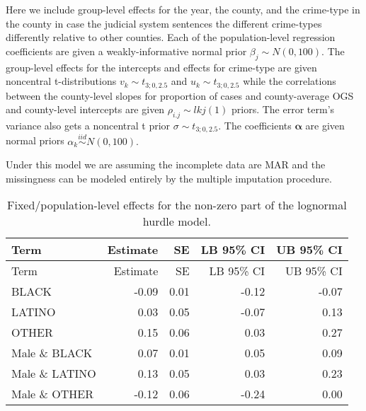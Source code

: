 \documentclass[
  letterpaper,
  DIV=11,
  numbers=noendperiod]{scrartcl}
\begin{document}
Here we include group-level effects for the year, the county, and the
crime-type in the county in case the judicial system sentences the
different crime-types differently relative to other counties. Each of
the population-level regression coefficients are given a
weakly-informative normal prior \(\beta_j \sim N(0, 100).\) The
group-level effects for the intercepts and effects for crime-type are
given noncentral t-distributions \(v_k \sim t_{3; 0, 2.5}\) and
\(u_k \sim t_{3; 0, 2.5}\) while the correlations between the
county-level slopes for proportion of cases and county-average OGS and
county-level intercepts are given \(\rho_{i.j} \sim lkj(1)\) priors. The
error term's variance also gets a noncentral t prior
\(\sigma \sim t_{3; 0, 2.5}.\) The coefficients \(\boldsymbol{\alpha}\)
are given normal priors \(\alpha_k \overset{iid}{\sim} N(0, 100).\)

Under this model we are assuming the incomplete data are MAR and the
missingness can be modeled entirely by the multiple imputation
procedure.

\hypertarget{tbl-brms-hurdle-model-summary-2-racesex}{}
\begin{longtable}[]{@{}lrrrr@{}}
\caption{\label{tbl-brms-hurdle-model-summary-2-racesex}Fixed/population-level
effects for the non-zero part of the lognormal hurdle
model.}\tabularnewline
\toprule\noalign{}
Term & Estimate & SE & LB 95\% CI & UB 95\% CI \\
\midrule\noalign{}
\endfirsthead
\toprule\noalign{}
Term & Estimate & SE & LB 95\% CI & UB 95\% CI \\
\midrule\noalign{}
\endhead
\bottomrule\noalign{}
\endlastfoot
BLACK & -0.09 & 0.01 & -0.12 & -0.07 \\
LATINO & 0.03 & 0.05 & -0.07 & 0.13 \\
OTHER & 0.15 & 0.06 & 0.03 & 0.27 \\
Male \& BLACK & 0.07 & 0.01 & 0.05 & 0.09 \\
Male \& LATINO & 0.13 & 0.05 & 0.03 & 0.23 \\
Male \& OTHER & -0.12 & 0.06 & -0.24 & 0.00 \\
\end{longtable}
\end{document}
